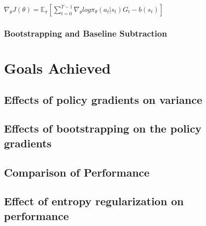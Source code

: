 \documentclass{article}
\begin{document}
$\nabla_\theta J(\theta) = \mathbb{E}_\pi[\sum _{t=0}^{T-1} \nabla_\theta log\pi_\theta (a_t|s_t)G_t - b(s_t)]$



\subsubsection{Bootstrapping and Baseline Subtraction}


\section{Goals Achieved}
\subsection{Effects of policy gradients on variance}
\subsection{Effects of bootstrapping on the policy gradients}
\subsection{Comparison of Performance}
\subsection{Effect of entropy regularization on performance}



\end{document}

